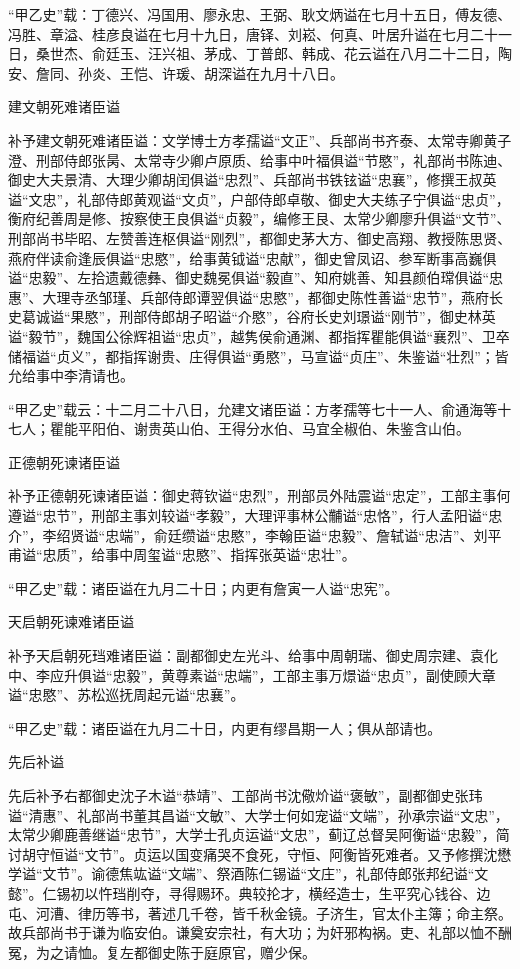 \documentclass[]{article}
\begin{document}
``甲乙史''载：丁德兴、冯国用、廖永忠、王弼、耿文炳谥在七月十五日，傅友德、冯胜、章溢、桂彦良谥在七月十九日，唐铎、刘崧、何真、叶居升谥在七月二十一日，桑世杰、俞廷玉、汪兴祖、茅成、丁普郎、韩成、花云谥在八月二十二日，陶安、詹同、孙炎、王恺、许瑗、胡深谥在九月十八日。

建文朝死难诸臣谥

补予建文朝死难诸臣谥：文学博士方孝孺谥``文正''、兵部尚书齐泰、太常寺卿黄子澄、刑部侍郎张昺、太常寺少卿卢原质、给事中叶福俱谥``节愍''，礼部尚书陈迪、御史大夫景清、大理少卿胡闰俱谥``忠烈''、兵部尚书铁铉谥``忠襄''，修撰王叔英谥``文忠''，礼部侍郎黄观谥``文贞''，户部侍郎卓敬、御史大夫练子宁俱谥``忠贞''，衡府纪善周是修、按察使王良俱谥``贞毅''，编修王艮、太常少卿廖升俱谥``文节''、刑部尚书毕昭、左赞善连枢俱谥``刚烈''，都御史茅大方、御史高翔、教授陈思贤、燕府伴读俞逢辰俱谥``忠愍''，给事黄钺谥``忠献''，御史曾凤诏、参军断事高巍俱谥``忠毅''、左拾遗戴德彝、御史魏冕俱谥``毅直''、知府姚善、知县颜伯瑺俱谥``忠惠''、大理寺丞邹瑾、兵部侍郎谭翌俱谥``忠愍''，都御史陈性善谥``忠节''，燕府长史葛诚谥``果愍''，刑部侍郎胡子昭谥``介愍''，谷府长史刘璟谥``刚节''，御史林英谥``毅节''，魏国公徐辉祖谥``忠贞''，越隽侯俞通渊、都指挥瞿能俱谥``襄烈''、卫卒储福谥``贞义''，都指挥谢贵、庄得俱谥``勇愍''，马宣谥``贞庄''、朱鉴谥``壮烈''；皆允给事中李清请也。

``甲乙史''载云：十二月二十八日，允建文诸臣谥：方孝孺等七十一人、俞通海等十七人；瞿能平阳伯、谢贵英山伯、王得分水伯、马宜全椒伯、朱鉴含山伯。

正德朝死谏诸臣谥

补予正德朝死谏诸臣谥：御史蒋钦谥``忠烈''，刑部员外陆震谥``忠定''，工部主事何遵谥``忠节''，刑部主事刘较谥``孝毅''，大理评事林公黼谥``忠恪''，行人孟阳谥``忠介''，李绍贤谥``忠端''，俞廷缵谥``忠愍''，李翰臣谥``忠毅''、詹轼谥``忠洁''、刘平甫谥``忠质''，给事中周玺谥``忠愍''、指挥张英谥``忠壮''。

``甲乙史''载：诸臣谥在九月二十日；内更有詹寅一人谥``忠宪''。

天启朝死谏难诸臣谥

补予天启朝死珰难诸臣谥：副都御史左光斗、给事中周朝瑞、御史周宗建、袁化中、李应升俱谥``忠毅''，黄尊素谥``忠端''，工部主事万燝谥``忠贞''，副使顾大章谥``忠愍''、苏松巡抚周起元谥``忠襄''。

``甲乙史''载：诸臣谥在九月二十日，内更有缪昌期一人；俱从部请也。

先后补谥

先后补予右都御史沈子木谥``恭靖''、工部尚书沈儆炌谥``褒敏''，副都御史张玮谥``清惠''、礼部尚书董其昌谥``文敏''、大学士何如宠谥``文端''，孙承宗谥``文忠''，太常少卿鹿善继谥``忠节''，大学士孔贞运谥``文忠''，蓟辽总督吴阿衡谥``忠毅''，简讨胡守恒谥``文节''。贞运以国变痛哭不食死，守恒、阿衡皆死难者。又予修撰沈懋学谥``文节''。谕德焦竑谥``文端''、祭酒陈仁锡谥``文庄''，礼部侍郎张邦纪谥``文懿''。仁锡初以忤珰削夺，寻得赐环。典较抡才，横经造士，生平究心钱谷、边屯、河漕、律历等书，著述几千卷，皆千秋金镜。子济生，官太仆主簿；命主祭。故兵部尚书于谦为临安伯。谦奠安宗社，有大功；为奸邪构祸。吏、礼部以恤不酬冤，为之请恤。复左都御史陈于庭原官，赠少保。
\end{document}
